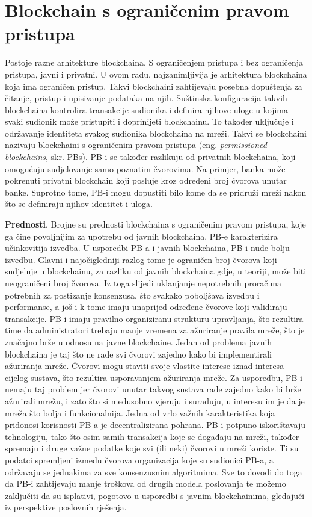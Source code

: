 \documentclass[times, utf8, diplomski]{fer}
\begin{document}
\chapter{Blockchain s ograničenim pravom pristupa}
Postoje razne arhitekture blockchaina. S ograničenjem pristupa i bez ograničenja pristupa, javni i privatni. U ovom radu, najzanimljivija je arhitektura blockchaina koja ima ograničen pristup. Takvi blockchaini zahtijevaju posebna dopuštenja za čitanje, pristup i upisivanje podataka na njih. Suštinska konfiguracija takvih blockchaina kontrolira transakcije sudionika i definira njihove uloge u kojima svaki sudionik može pristupiti i doprinijeti blockchainu. To također uključuje i održavanje identiteta svakog sudionika blockchaina na mreži. Takvi se blockchaini nazivaju blockchaini s ograničenim pravom pristupa (eng. \textit{permissioned blockchains}, skr. PBs). PB-i se također razlikuju od privatnih blockchaina, koji omogućuju sudjelovanje samo poznatim čvorovima. Na primjer, banka može pokrenuti privatni blockchain koji posluje kroz određeni broj čvorova unutar banke. Suprotno tome, PB-i mogu dopustiti bilo kome da se pridruži mreži nakon što se definiraju njihov identitet i uloga.

\textbf{Prednosti}. Brojne su prednosti blockchaina s ograničenim pravom pristupa, koje ga čine povoljnijim za upotrebu od javnih blockchaina. PB-e karakterizira učinkovitija izvedba. U usporedbi PB-a i javnih blockchaina,  PB-i nude bolju izvedbu. Glavni i najočigledniji razlog tome je ograničen broj čvorova koji sudjeluje u blockchainu, za razliku od javnih blockchaina gdje, u teoriji, može biti neograničeni broj čvorova. Iz toga slijedi uklanjanje nepotrebnih proračuna potrebnih za postizanje konsenzusa, što svakako poboljšava izvedbu i performanse, a još i k tome imaju unaprijed određene čvorove koji validiraju transakcije. PB-i imaju pravilno organiziranu strukturu upravljanja, što rezultira time da administratori trebaju manje vremena za ažuriranje pravila mreže, što je značajno brže u odnosu na javne blockchaine. Jedan od problema javnih blockchaina je taj što ne rade svi čvorovi zajedno kako bi implementirali ažuriranja mreže. Čvorovi mogu staviti svoje vlastite interese iznad interesa cijelog sustava, što rezultira usporavanjem ažuriranja mreže. Za usporedbu, PB-i nemaju taj problem jer čvorovi unutar takvog sustava rade zajedno kako bi brže ažurirali mrežu, i zato što si međusobno vjeruju i surađuju, u interesu im je da je mreža što bolja i funkcionalnija. Jedna od vrlo važnih karakteristika koja pridonosi korisnosti PB-a je decentralizirana pohrana. PB-i potpuno iskorištavaju tehnologiju, tako što osim samih transakcija koje se događaju na mreži, također spremaju i druge važne podatke koje svi (ili neki) čvorovi u mreži koriste. Ti su podatci spremljeni između čvorova organizacija koje su sudionici PB-a, a održavaju se jednakima za sve konsenzusnim algoritmima. Sve to dovodi do toga da PB-i zahtijevaju manje troškova od drugih modela poslovanja te možemo zaključiti da su isplativi, pogotovo u usporedbi s javnim blockchainima, gledajući iz perspektive poslovnih rješenja.
\end{document}

